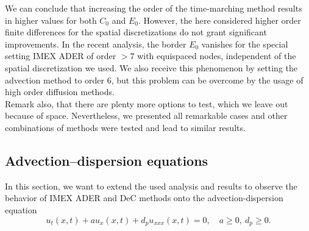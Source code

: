 We can conclude that increasing the order of the time-marching method results in higher values for both $C_0$ and $E_0$. However, the here considered higher order finite differences for the spatial discretizations do not grant significant improvements. In the recent analysis, the border $E_0$ vanishes for the special setting IMEX ADER of order $>7$  with equispaced nodes, independent of the spatial discretization we used. We also receive this phenomenon by setting the advection method to order 6, but this problem can be overcome by the usage of high order diffusion methods.\\
Remark also, that there are plenty more options to test, which we leave out because of space. Nevertheless, we presented all remarkable cases and other combinations of methods were tested and lead to similar results.

\subsection{Advection--dispersion equations}
In this section, we want to extend the used analysis and results to observe the behavior of IMEX ADER and DeC methods onto the advection-dispersion equation
\begin{equation}
\label{eq: A-Disp_equation}
u_t(x,t) + au_x(x,t) + d_pu_{xxx}(x,t) = 0, \quad a\ge0, \ d_p \ge 0.
\end{equation}
